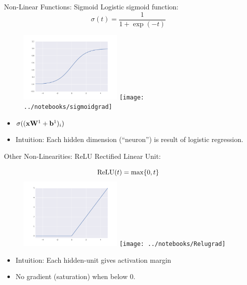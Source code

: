\documentclass{beamer}
\begin{document}
\begin{frame}{Non-Linear Functions: Sigmoid}
  Logistic sigmoid function:
  \[\sigma(t) = \frac{1}{1 + \exp(-t)} \]
  \begin{figure}
    \centering
    \includegraphics[width=5cm]{../notebooks/sigmoid}     \texttt{[image: ../notebooks/sigmoidgrad]}
  \end{figure}

  \begin{itemize}
  \item $\sigma((\mathbf{x}\mathbf{W}^1 + \mathbf{b}^1)_i)$
  \item Intuition: Each hidden dimension (``neuron'') is result of logistic regression.
  \end{itemize}
\end{frame}


\begin{frame}{Other Non-Linearities: ReLU}
  Rectified Linear Unit:
  \begin{figure}
    \centering
    \[\relu(t) = \max\{0, t\} \]
    \includegraphics[width=5cm]{../notebooks/Relu}
    \texttt{[image: ../notebooks/Relugrad]}
  \end{figure}
  \begin{itemize}
  \item Intuition: Each hidden-unit gives activation margin
  \item No gradient (saturation) when below 0.
  \end{itemize}
\end{frame}
\end{document}

